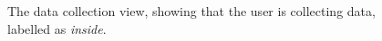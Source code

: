 \begin{figure}[h!]
\begin{minipage}{0.41\textwidth}
        \label{fig:selected_devices}
    \end{minipage}\hfill
    \begin{minipage}{0.41\textwidth}
        \centering
        \caption{The data collection view, showing that the user is collecting data, labelled as \textit{inside}.}
        \label{fig:collecting_data}
    \end{minipage}
\end{figure}
